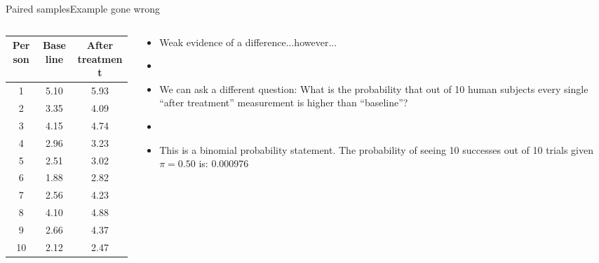 \documentclass[xcolor=dvipsnames]{beamer}
\begin{document}
\begin{frame}{Paired samples}{Example gone wrong}
	\begin{columns}
		\begin{column}{.4 \textwidth}
					{\scriptsize
				\begin{tabular}{|c|c|c|}
					\hline
					\textbf{Person} & \textbf{Baseline} &  \textbf{After treatment} \\ \hline \hline
					1  &    5.10 &   5.93  \\ \hline 
					2  &    3.35 &   4.09 \\ \hline 
					3  &   4.15  &  4.74  \\ \hline 
					4  &   2.96  &  3.23  \\ \hline 
					5  &    2.51 &   3.02 \\ \hline 
					6  &   1.88  &  2.82  \\ \hline 
					7  &   2.56  &  4.23 \\ \hline 
					8  &    4.10 &   4.88 \\ \hline 
					9  &   2.66  &  4.37  \\ \hline 
					10  &    2.12  &  2.47 \\ \hline 
				\end{tabular}
			}
		\end{column}
		\begin{column}{.6 \textwidth}
			\begin{itemize}
				\item Weak evidence of a difference...however... \pause
				\item[]
				\item We can ask a different question: What is the probability that out of 10 human subjects every single ``after treatment'' measurement is higher than ``baseline''? \pause
				\item[]
				\item This is a binomial probability statement. The probability of seeing 10 successes out of 10 trials given $\pi = 0.50$ is: 0.000976
			\end{itemize}
		\end{column}
	\end{columns}
\end{frame}
\end{document}
